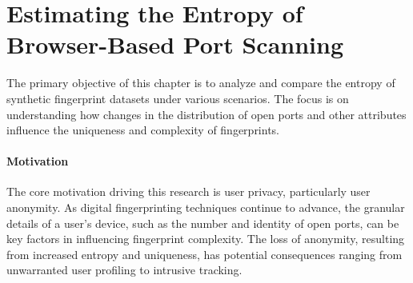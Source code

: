 


\chapter{Estimating the Entropy of Browser-Based Port Scanning}


The primary objective of this chapter is to analyze and compare the entropy of synthetic fingerprint datasets under various scenarios. The focus is on understanding how changes in the distribution of open ports and other attributes influence the uniqueness and complexity of fingerprints. 

\subsubsection{Motivation}

The core motivation driving this research is user privacy, particularly user anonymity. As digital fingerprinting techniques continue to advance, the granular details of a user's device, such as the number and identity of open ports, can be key factors in influencing fingerprint complexity. The loss of anonymity, resulting from increased entropy and uniqueness, has potential consequences ranging from unwarranted user profiling to intrusive tracking.

